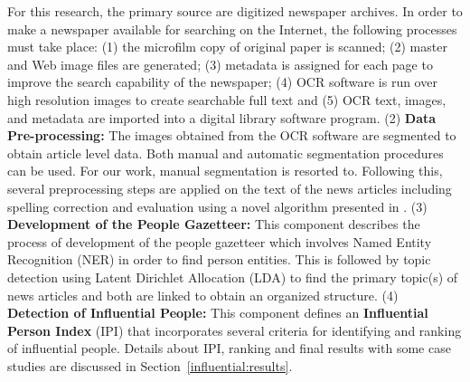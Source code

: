 For this research, the primary source are digitized newspaper archives. In order to make a newspaper available for searching on the Internet,
the following processes \cite{dutta2011learning} must take place: (1) the microfilm copy of original paper is scanned; (2) master and Web image files are
generated; (3) metadata is assigned for each page to improve the
search capability of the newspaper; (4) OCR software is run over high
resolution images to create searchable full text and (5) OCR text,
images, and metadata are imported into a digital library software
program. 
(2) \textbf{Data Pre-processing: } The images obtained from the OCR software are segmented to obtain article level data. Both manual and automatic segmentation procedures can be used. 
For our work, manual segmentation is resorted to.
Following this, several preprocessing steps are applied on the text of the news
articles including  spelling correction and evaluation using a novel algorithm presented in \cite{Gupta_14a}.
(3)  \textbf{Development of the People Gazetteer: }This component describes the process of development
of the people gazetteer which involves Named Entity Recognition (NER) in order to find person
entities. This is followed by topic detection using Latent Dirichlet Allocation (LDA) to find the primary topic(s) of news articles
and both are linked to obtain an organized structure.
(4) \textbf{Detection of Influential People: } This component defines an \textbf{Influential Person Index}
(IPI) that incorporates several criteria for identifying and ranking of influential
people. Details about IPI, ranking and final results with some case studies are discussed in Section~\ref{influential:results}.
